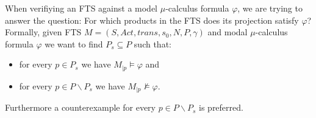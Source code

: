 When verifiying an FTS against a model $\mu$-calculus formula $\varphi$, we are trying to answer the question: For which products in the FTS does its projection satisfy $\varphi$? Formally, given FTS $M = (S, Act, trans, s_0, N, P, \gamma)$ and modal $\mu$-calculus formula $\varphi$ we want to find $P_s \subseteq P$ such that:
\begin{itemize}
	\item for every $p \in P_s$ we have $M_{|p} \models \varphi$ and
	\item for every $p \in P \backslash P_s$ we have $M_{|p} \not\models \varphi$.
\end{itemize}
Furthermore a counterexample for every $p \in P \backslash P_s$ is preferred.